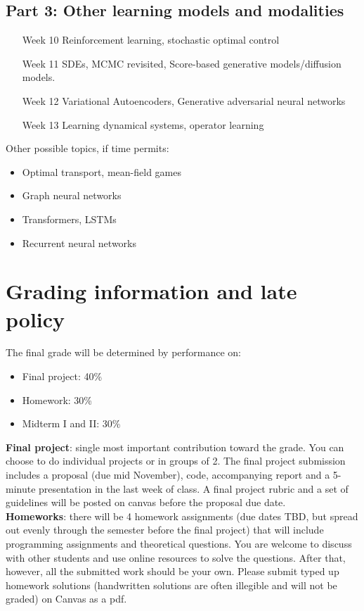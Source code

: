 \documentclass[12pt]{article}
\begin{document}
\subsection*{Part 3: Other learning models and modalities}
\begin{itemize}
	\item[Week 10] Reinforcement learning, stochastic optimal control
	\item[Week 11 ] SDEs, MCMC revisited, Score-based generative models/diffusion models.
	\item[Week 12] Variational Autoencoders, Generative adversarial neural networks
	\item[Week 13] Learning dynamical systems, operator learning
\end{itemize}
Other possible topics, if time permits:
\begin{itemize}
	\item Optimal transport, mean-field games
	\item Graph neural networks
	\item Transformers, LSTMs
	\item Recurrent neural networks
\end{itemize}

\section{Grading information and late policy}

The final grade will be determined by performance on:
\begin{itemize}
	\item Final project: 40\%
	\item Homework: 30\%
	\item Midterm I and II: 30\%
\end{itemize}

\textbf{Final project}: single most important contribution toward the grade. You can choose to do individual projects or in groups of 2. The final project submission includes a proposal (due mid November), code, accompanying report and a 5-minute presentation in the last week of class. A final project rubric and a set of guidelines will be posted on canvas before the proposal due date.\\

\textbf{Homeworks}: there will be 4 homework assignments (due dates TBD, but spread out evenly through the semester before the final project) that will include programming assignments and theoretical questions. You are welcome to discuss with other students and use online resources to solve the questions. After that, however, all the submitted work should be your own. Please submit typed up homework solutions (handwritten solutions are often illegible and will not be graded) on Canvas as a pdf. \\
\end{document}
